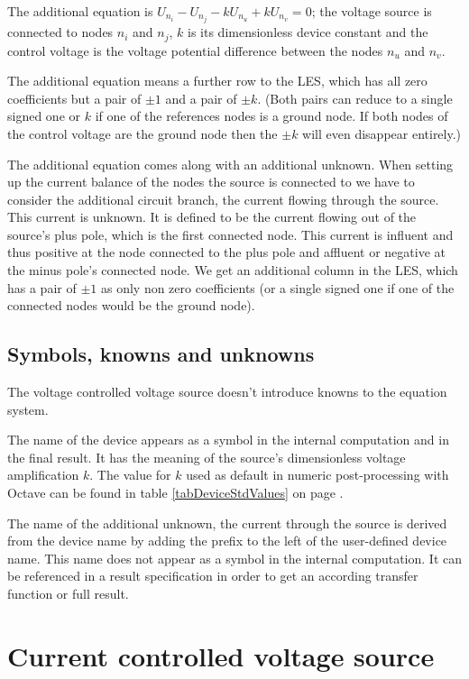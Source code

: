 The additional equation is $U_{n_i} - U_{n_j} - kU_{n_u} + kU_{n_v} = 0$;
the voltage source is connected to nodes $n_i$ and $n_j$, $k$ is its
dimensionless device constant and the control voltage is the voltage
potential difference between the nodes $n_u$ and $n_v$.
 
The additional equation means a further row to the LES, which has all zero
coefficients but a pair of $\pm 1$ and a pair of $\pm k$. (Both pairs can
reduce to a single signed one or $k$ if one of the references nodes is a
ground node. If both nodes of the control voltage are the ground node then
the $\pm k$ will even disappear entirely.)

The additional equation comes along with an additional unknown. When
setting up the current balance of the nodes the source is connected to we
have to consider the additional circuit branch, the current flowing
through the source. This current is unknown. It is defined to be the
current flowing out of the source's plus pole, which is the first
connected node. This current is influent and thus positive at the node
connected to the plus pole and affluent or negative at the minus pole's
connected node. We get an additional column in the LES, which has a pair
of $\pm 1$ as only non zero coefficients (or a single signed one if one of
the connected nodes would be the ground node).


\subsection{Symbols, knowns and unknowns}

The voltage controlled voltage source doesn't introduce knowns to the
equation system.

The name of the device appears as a symbol in the internal computation and
in the final result. It has the meaning of the source's dimensionless
voltage amplification $k$. The value for $k$ used as default in numeric
post-processing with Octave can be found in table \ref{tabDeviceStdValues}
on page \pageref{tabDeviceStdValues}.

The name of the additional unknown, the current through the source is
derived from the device name by adding the prefix  to the left
of the user-defined device name. This name does not appear as a symbol in
the internal computation. It can be referenced in a result specification
in order to get an according transfer function or full result.


\section{Current controlled voltage source}

